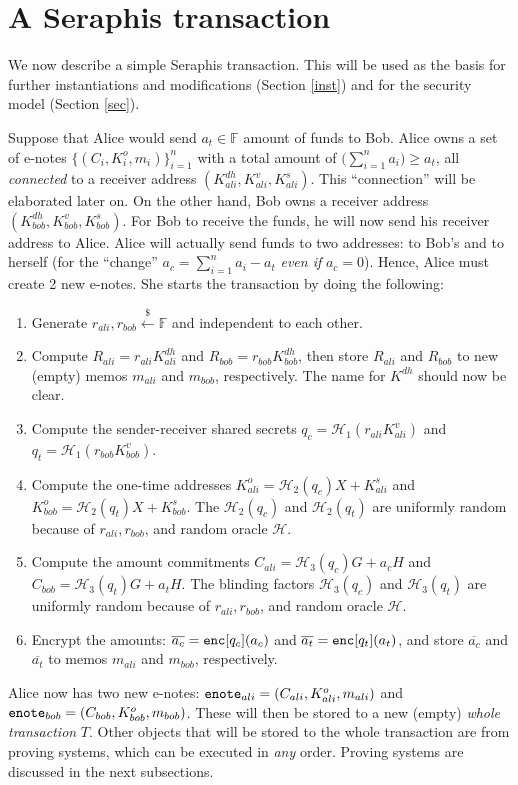 \documentclass{article}
\theoremstyle{plain}
\theoremstyle{remark}
\begin{document}
\section{A Seraphis transaction}\label{ser-tx}
We now describe a simple Seraphis transaction. This will be used as the basis for further instantiations and modifications (Section \ref{inst}) and for the security model (Section \ref{sec}).

Suppose that Alice would send $a_t\in\mathbb{F}$ amount of funds to Bob. Alice owns a set of e-notes $\{(C_i,K_i^o,m_i)\}_{i=1}^n$ with a total amount of $\big(\sum_{i=1}^{n}{a_i}\big)\ge a_t$, all \textit{connected} to a receiver address $(K_{ali}^{dh}, K_{ali}^v, K_{ali}^s)$. This ``connection'' will be elaborated later on. On the other hand, Bob owns a receiver address $(K_{bob}^{dh}, K_{bob}^v, K_{bob}^s)$. For Bob to receive the funds, he will now send his receiver address to Alice. Alice will actually send funds to two addresses: to Bob's and to herself (for the ``change'' $a_{c} = \sum_{i=1}^{n}{a_i} - a_t$ \textit{even if} $a_{c}=0$). Hence, Alice must create 2 new e-notes. She starts the transaction by doing the following:
\begin{enumerate}
    \item Generate $r_{ali}, r_{bob}\xleftarrow{\$}\mathbb{F}$ and independent to each other.
    \item Compute $R_{ali} = r_{ali}K_{ali}^{dh}$ and $R_{bob} = r_{bob}K_{bob}^{dh}$, then store $R_{ali}$ and $R_{bob}$ to new (empty) memos $m_{ali}$ and $m_{bob}$, respectively. The name for $K^{dh}$ should now be clear.
    \item Compute the sender-receiver shared secrets $q_c = \mathcal{H}_1(r_{ali}K_{ali}^{v})$ and $q_t = \mathcal{H}_1(r_{bob}K_{bob}^{v})$.
    \item Compute the one-time addresses $K_{ali}^o = \mathcal{H}_2(q_c)X + K_{ali}^s$ and $K_{bob}^o = \mathcal{H}_2(q_t)X + K_{bob}^s$. The $\mathcal{H}_2(q_c)$ and $\mathcal{H}_2(q_t)$ are uniformly random because of $r_{ali}, r_{bob}$, and random oracle $\mathcal{H}$.
    \item Compute the amount commitments $C_{ali} = \mathcal{H}_3(q_c)G + a_c H$ and $C_{bob} = \mathcal{H}_3(q_t)G + a_t H$. The blinding factors $\mathcal{H}_3(q_c)$ and $\mathcal{H}_3(q_t)$ are uniformly random because of $r_{ali}, r_{bob}$, and random oracle $\mathcal{H}$.
    \item Encrypt the amounts: $\overline{a_c} = {\tt enc}[q_c](a_c)$ and $\overline{a_t} = {\tt enc}[q_t](a_t)$, and store $\overline{a_c}$ and $\overline{a_t}$ to memos $m_{ali}$ and $m_{bob}$, respectively.
\end{enumerate}
Alice now has two new e-notes: ${\tt enote}_{ali} = (C_{ali}, K_{ali}^o, m_{ali})$ and ${\tt enote}_{bob} = (C_{bob}, K_{bob}^o, m_{bob})$. These will then be stored to a new (empty) \textit{whole transaction} $T$. Other objects that will be stored to the whole transaction are from proving systems, which can be executed in \textit{any} order. Proving systems are discussed in the next subsections.
\end{document}
